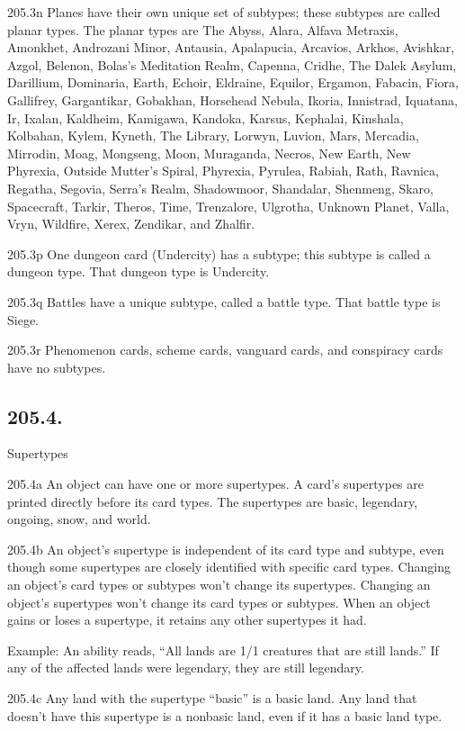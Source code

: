 205.3n Planes have their own unique set of subtypes; these subtypes are called planar types. The planar types are The Abyss, Alara, Alfava Metraxis, Amonkhet, Androzani Minor, Antausia, Apalapucia, Arcavios, Arkhos, Avishkar, Azgol, Belenon, Bolas’s Meditation Realm, Capenna, Cridhe, The Dalek Asylum, Darillium, Dominaria, Earth, Echoir, Eldraine, Equilor, Ergamon, Fabacin, Fiora, Gallifrey, Gargantikar, Gobakhan, Horsehead Nebula, Ikoria, Innistrad, Iquatana, Ir, Ixalan, Kaldheim, Kamigawa, Kandoka, Karsus, Kephalai, Kinshala, Kolbahan, Kylem, Kyneth, The Library, Lorwyn, Luvion, Mars, Mercadia, Mirrodin, Moag, Mongseng, Moon, Muraganda, Necros, New Earth, New Phyrexia, Outside Mutter’s Spiral, Phyrexia, Pyrulea, Rabiah, Rath, Ravnica, Regatha, Segovia, Serra’s Realm, Shadowmoor, Shandalar, Shenmeng, Skaro, Spacecraft, Tarkir, Theros, Time, Trenzalore, Ulgrotha, Unknown Planet, Valla, Vryn, Wildfire, Xerex, Zendikar, and Zhalfir.

205.3p One dungeon card (Undercity) has a subtype; this subtype is called a dungeon type. That dungeon type is Undercity.

205.3q Battles have a unique subtype, called a battle type. That battle type is Siege.

205.3r Phenomenon cards, scheme cards, vanguard cards, and conspiracy cards have no subtypes.

\subsection*{205.4.}
Supertypes

205.4a An object can have one or more supertypes. A card’s supertypes are printed directly before its card types. The supertypes are basic, legendary, ongoing, snow, and world.

205.4b An object’s supertype is independent of its card type and subtype, even though some supertypes are closely identified with specific card types. Changing an object’s card types or subtypes won’t change its supertypes. Changing an object’s supertypes won’t change its card types or subtypes. When an object gains or loses a supertype, it retains any other supertypes it had.

Example: An ability reads, “All lands are 1/1 creatures that are still lands.” If any of the affected lands were legendary, they are still legendary.

205.4c Any land with the supertype “basic” is a basic land. Any land that doesn’t have this supertype is a nonbasic land, even if it has a basic land type.

